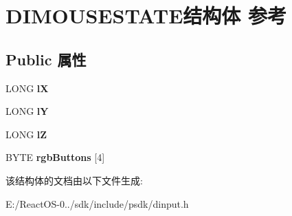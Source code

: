 \hypertarget{struct_d_i_m_o_u_s_e_s_t_a_t_e}{}\section{D\+I\+M\+O\+U\+S\+E\+S\+T\+A\+T\+E结构体 参考}
\label{struct_d_i_m_o_u_s_e_s_t_a_t_e}
\subsection*{Public 属性}
\begin{DoxyCompactItemize}
\item 
\mbox{\label{struct_d_i_m_o_u_s_e_s_t_a_t_e_a713c0abff0fef7e0a7459f33f02c681c}} 
L\+O\+NG {\bfseries lX}
\item 
\mbox{\label{struct_d_i_m_o_u_s_e_s_t_a_t_e_a999d9262554325dd4f24e22a5e839170}} 
L\+O\+NG {\bfseries lY}
\item 
\mbox{\label{struct_d_i_m_o_u_s_e_s_t_a_t_e_a9609ba39aa27df25b6a6a9adf30a61e1}} 
L\+O\+NG {\bfseries lZ}
\item 
\mbox{\label{struct_d_i_m_o_u_s_e_s_t_a_t_e_a81673f458ae4cf3d60d2387d8f0a5ab4}} 
B\+Y\+TE {\bfseries rgb\+Buttons} \mbox{[}4\mbox{]}
\end{DoxyCompactItemize}


该结构体的文档由以下文件生成\+:\begin{DoxyCompactItemize}
\item 
E\+:/\+React\+O\+S-\/0../sdk/include/psdk/dinput.\+h\end{DoxyCompactItemize}
